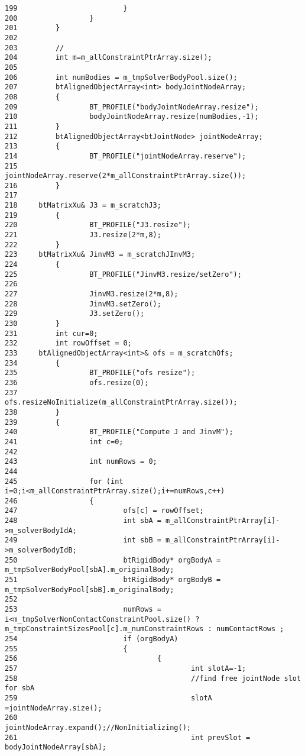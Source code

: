 \begin{Code}
\begin{verbatim}
199                         }
200                 }
201         }
202 
203         //
204         int m=m_allConstraintPtrArray.size();
205 
206         int numBodies = m_tmpSolverBodyPool.size();
207         btAlignedObjectArray<int> bodyJointNodeArray;
208         {
209                 BT_PROFILE("bodyJointNodeArray.resize");
210                 bodyJointNodeArray.resize(numBodies,-1);
211         }
212         btAlignedObjectArray<btJointNode> jointNodeArray;
213         {
214                 BT_PROFILE("jointNodeArray.reserve");
215                 jointNodeArray.reserve(2*m_allConstraintPtrArray.size());
216         }
217 
218     btMatrixXu& J3 = m_scratchJ3;
219         {
220                 BT_PROFILE("J3.resize");
221                 J3.resize(2*m,8);
222         }
223     btMatrixXu& JinvM3 = m_scratchJInvM3;
224         {
225                 BT_PROFILE("JinvM3.resize/setZero");
226 
227                 JinvM3.resize(2*m,8);
228                 JinvM3.setZero();
229                 J3.setZero();
230         }
231         int cur=0;
232         int rowOffset = 0;
233     btAlignedObjectArray<int>& ofs = m_scratchOfs;
234         {
235                 BT_PROFILE("ofs resize");
236                 ofs.resize(0);
237                 ofs.resizeNoInitialize(m_allConstraintPtrArray.size());
238         }                               
239         {
240                 BT_PROFILE("Compute J and JinvM");
241                 int c=0;
242 
243                 int numRows = 0;
244 
245                 for (int i=0;i<m_allConstraintPtrArray.size();i+=numRows,c++)
246                 {
247                         ofs[c] = rowOffset;
248                         int sbA = m_allConstraintPtrArray[i]->m_solverBodyIdA;
249                         int sbB = m_allConstraintPtrArray[i]->m_solverBodyIdB;
250                         btRigidBody* orgBodyA = m_tmpSolverBodyPool[sbA].m_originalBody;
251                         btRigidBody* orgBodyB = m_tmpSolverBodyPool[sbB].m_originalBody;
252 
253                         numRows = i<m_tmpSolverNonContactConstraintPool.size() ? m_tmpConstraintSizesPool[c].m_numConstraintRows : numContactRows ;
254                         if (orgBodyA)
255                         {
256                                 {
257                                         int slotA=-1;
258                                         //find free jointNode slot for sbA
259                                         slotA =jointNodeArray.size();
260                                         jointNodeArray.expand();//NonInitializing();
261                                         int prevSlot = bodyJointNodeArray[sbA];

\end{verbatim}
\end{Code}
